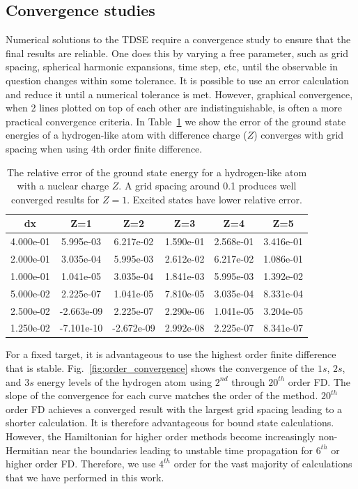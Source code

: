 \subsection{Convergence studies} %
\label{sub:convergence_studies}
Numerical solutions to the TDSE require a convergence study to ensure that the final results are reliable. One does this by varying  a free parameter, such as grid spacing, spherical harmonic expansions, time step, etc, until the observable in question changes within some tolerance. It is possible to use an error calculation and reduce it until a numerical tolerance is met. However, graphical convergence, when 2 lines plotted on top of each other are indistinguishable, is often a more practical convergence criteria. In Table~\ref{tab:grid_spacing} we show the error of the ground state energies of a hydrogen-like atom with difference charge ($Z$) converges with grid spacing when using 4th order finite difference.
\begin{table}[t]
\begin{center}
\begin{tabular}{|c|c|c|c|c|c|}
\hline
dx & Z=1 & Z=2 & Z=3 & Z=4 & Z=5 \\ \hline
4.000e-01 & 5.995e-03 & 6.217e-02 & 1.590e-01 & 2.568e-01 & 3.416e-01\\ \hline
2.000e-01 & 3.035e-04 & 5.995e-03 & 2.612e-02 & 6.217e-02 & 1.086e-01\\ \hline
1.000e-01 & 1.041e-05 & 3.035e-04 & 1.841e-03 & 5.995e-03 & 1.392e-02\\ \hline
5.000e-02 & 2.225e-07 & 1.041e-05 & 7.810e-05 & 3.035e-04 & 8.331e-04\\ \hline
2.500e-02 & -2.663e-09 & 2.225e-07 & 2.290e-06 & 1.041e-05 & 3.204e-05\\ \hline
1.250e-02 & -7.101e-10 & -2.672e-09 & 2.992e-08 & 2.225e-07 & 8.341e-07\\ \hline
\end{tabular}
\end{center}
  \caption{\label{tab:grid_spacing}The relative error of the ground state energy for a hydrogen-like atom with a nuclear charge $Z$. A grid spacing around 0.1 produces well converged results for $Z=1$. Excited states have lower relative error.}
\end{table}

For a fixed target, it is advantageous to use the highest order finite difference that is stable. Fig.~\ref{fig:order_convergence} shows the convergence of the $1s$, $2s$, and $3s$ energy levels of the hydrogen atom using $2^{nd}$ through $20^{th}$ order FD. The slope of the convergence for each curve matches the order of the method. $20^{th}$ order FD achieves a converged result with the largest grid spacing leading to a shorter calculation. It is therefore advantageous for bound state calculations. However, the Hamiltonian for higher order methods become increasingly non-Hermitian near the boundaries leading to unstable time propagation for $6^{th}$ or higher order FD. Therefore, we use $4^{th}$ order for the vast majority of calculations that we have performed in this work.


